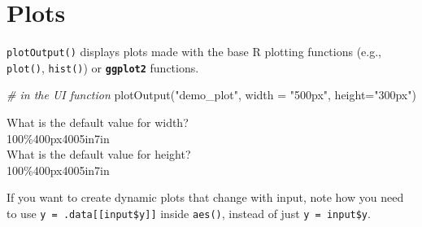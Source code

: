 \documentclass[
  oneside]{book}
\newenvironment{Shaded}{\begin{snugshade}}{\end{snugshade}}
\newcommand{\AttributeTok}[1]{\textcolor[rgb]{0.77,0.63,0.00}{#1}}
\newcommand{\CommentTok}[1]{\textcolor[rgb]{0.56,0.35,0.01}{\textit{#1}}}
\newcommand{\ConstantTok}[1]{\textcolor[rgb]{0.00,0.00,0.00}{#1}}
\newcommand{\FunctionTok}[1]{\textcolor[rgb]{0.00,0.00,0.00}{#1}}
\newcommand{\NormalTok}[1]{#1}
\newcommand{\OtherTok}[1]{\textcolor[rgb]{0.56,0.35,0.01}{#1}}
\newcommand{\SpecialCharTok}[1]{\textcolor[rgb]{0.00,0.00,0.00}{#1}}
\newcommand{\StringTok}[1]{\textcolor[rgb]{0.31,0.60,0.02}{#1}}
\begin{document}
\hypertarget{plots}{%
\section{Plots}\label{plots}}

\texttt{plotOutput}\texttt{()} displays plots made with the base R plotting functions (e.g., \texttt{plot}\texttt{()}, \texttt{hist}\texttt{()}) or \textbf{\texttt{ggplot2}} functions.

\begin{Shaded}
\begin{Highlighting}[]
\CommentTok{\# in the UI function}
\FunctionTok{plotOutput}\NormalTok{(}\StringTok{"demo\_plot"}\NormalTok{, }\AttributeTok{width =} \StringTok{"500px"}\NormalTok{, }\AttributeTok{height=}\StringTok{"300px"}\NormalTok{)}
\end{Highlighting}
\end{Shaded}

What is the default value for \AttributeTok{width}?\\
100\%400px4005in7in\\
What is the default value for \AttributeTok{height}?\\
100\%400px4005in7in

\begin{Shaded}
\end{Shaded}

\begin{warning}
If you want to create dynamic plots that change with input, note how you need to use \texttt{y\ =\ .data{[}{[}input\$y{]}{]}} inside \texttt{aes}\texttt{()}, instead of just \texttt{y\ =\ input\$y}.

\end{warning}
\end{document}
